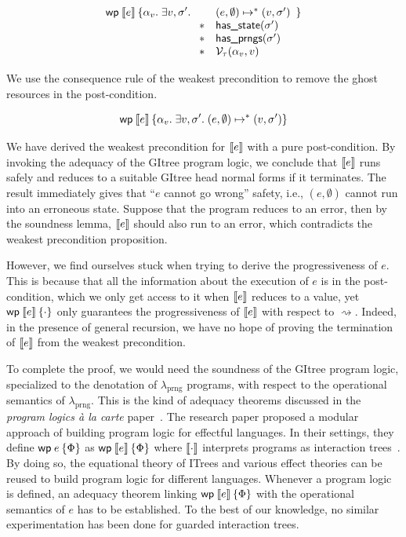 \documentclass{article}
\theoremstyle{definition}
\theoremstyle{plain}
\theoremstyle{remark}
\newcommand{\prng}{\mathrm{prng}}
\newcommand{\redu}{\mapsto}
\newcommand{\Redu}{\rightsquigarrow}
\newcommand{\hasstate}{\textsf{has\_state}}
\newcommand{\hasprngs}{\textsf{has\_prngs}}
\begin{document}
\[
  \wpre{\sem{e}}{\alpha_v.\; \exists v,\sigma'.\;
    \begin{array}[t]{ll}
        &(e,\emptyset) \redu^\ast (v,\sigma')\\
      \star & \hasstate(\sigma')\\
      \star & \hasprngs(\sigma')\\
      \star & \mathcal{V}_{\type}(\alpha_v,v)
  \end{array}}
\]

We use the consequence rule of the weakest precondition to remove the ghost resources in the post-condition.

\[
  \wpre{\sem{e}}{\alpha_v.\; \exists v,\sigma'.\; (e,\emptyset) \redu^\ast (v,\sigma') }
\]


We have derived the weakest precondition for \(\llbracket {e} \rrbracket\) with a pure post-condition.
By invoking the adequacy of the GItree program logic, we conclude that \(\llbracket {e} \rrbracket\) runs safely and reduces to a suitable GItree head normal forms if it terminates.
The result immediately gives that ``\(e\) cannot go wrong'' safety, i.e.,  \((e,\emptyset)\) cannot run into an erroneous state.
Suppose that the program reduces to an error, then by the soundness lemma, \(\llbracket {e} \rrbracket\) should also run to an error, which contradicts the weakest precondition proposition.\par
However, we find ourselves stuck when trying to derive the progressiveness of \(e\).
This is because that all the information about the execution of \(e\) is in the post-condition, which we only get access to it when \(\llbracket {e} \rrbracket\) reduces to a value, yet \(\wpre{\sem{e}}{\cdot}\) only guarantees the progressiveness of \(\llbracket {e} \rrbracket\) with respect to \(\Redu\).
Indeed, in the presence of general recursion, we have no hope of proving the termination of \(\llbracket {e} \rrbracket\) from the weakest precondition.\par

To complete the proof, we would need the soundness of the GItree program logic, specialized to the denotation of \(\lambda_\prng\) programs, with respect to the operational semantics of \(\lambda_\prng\).
This is the kind of adequacy theorems discussed in the \emph{program logics \`a la carte} paper~\cite{proglog-carte}.
The research paper proposed a modular approach of building program logic for effectful languages.
In their settings, they define \(\wpre{e}{\Phi}\) as \(\wpre{\sem{e}}{\Phi}\) where \(\llbracket {\cdot} \rrbracket\) interprets programs as interaction trees~\cite{itrees}. By doing so, the equational theory of ITrees and various effect theories can be reused to build program logic for different languages.
Whenever a program logic is defined, an adequacy theorem linking \(\wpre{\sem{e}}{\Phi}\) with the operational semantics of \(e\) has to be established.
To the best of our knowledge, no similar experimentation has been done for guarded interaction trees.
\end{document}
